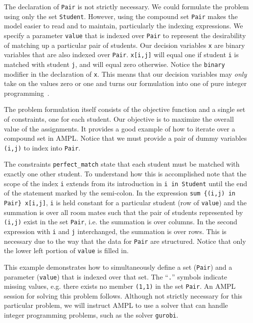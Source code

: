 The declaration of \texttt{Pair} is not strictly necessary. We could formulate the problem
using only the set \texttt{Student}. However, using the compound set \texttt{Pair}
makes the model easier to read and to maintain, particularly the indexing expressions.
We specify a parameter \texttt{value} that is indexed over \texttt{Pair} to represent the
desirability of matching up a particular pair of students. Our decision variables
\texttt{x} are binary variables that are also indexed over \texttt{Pair}. 
\texttt{x[i,j]} will equal one if student \texttt{i} is matched with student \texttt{j},
and will equal zero otherwise. Notice the \texttt{binary} modifier in the declaration
of \texttt{x}. This means that our decision variables may \emph{only} take on the values zero
or one and turns our formulation into one of pure integer programming~\cite{nemhauser:1988}.

The problem formulation itself consists of the objective function and a single set
of constraints, one for each student. Our objective is to maximize the overall
value of the assignments. It provides a good example of how to iterate over a 
compound set in AMPL. Notice that we must provide a pair of dummy variables
\texttt{(i,j)} to index into \texttt{Pair}. 

The constraints \texttt{perfect\_match} state that each student must be
matched with exactly one other student. To understand how this is 
accomplished note that the scope of the index \texttt{i} extends from 
its introduction in \texttt{i in Student} until the end of the statement
marked by the semi-colon. In the expression \texttt{sum \{(i,j) in Pair\} x[i,j]},
\texttt{i} is held constant for a particular student (row of \texttt{value}) 
and the summation is over all room mates such that the pair of students
represented by \texttt{(i,j)} exist in the set \texttt{Pair}, i.e. the
summation is over columns.
In the second expression with \texttt{i} and \texttt{j} interchanged, the
summation is over rows. This is necessary
due to the way that the data for \texttt{Pair} are structured. Notice that
only the lower left portion of \texttt{value} is filled in.

This example demonstrates how to simultaneously define a set (\texttt{Pair}) and a parameter
(\texttt{value}) that is indexed over that set. The ``\texttt{.}'' symbols indicate
missing values, e.g. there exists no member \texttt{(1,1)} in the set \texttt{Pair}.
An AMPL session for solving this problem follows. Although not strictly necessary
for this particular problem, we will instruct AMPL to use
a solver that can handle integer programming problems, such as the solver
\texttt{gurobi}. 

